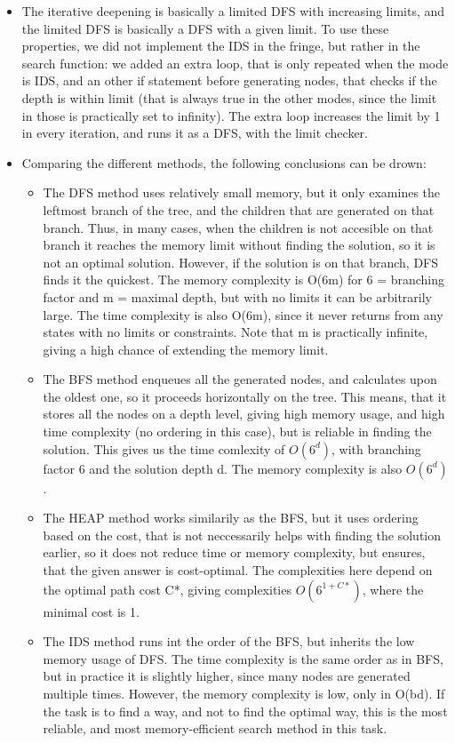 \documentclass{article}
\begin{document}
\begin{itemize}
	\item The iterative deepening is basically a limited DFS with increasing limits, and the limited DFS is basically a DFS with a given limit. To use these properties, we did not implement the IDS in the fringe, but rather in the search function: we added an extra loop, that is only repeated when the mode is IDS, and an other if statement before generating nodes, that checks if the depth is within limit (that is always true in the other modes, since the limit in those is practically set to infinity). The extra loop increases the limit by 1 in every iteration, and runs it as a DFS, with the limit checker.
	\item Comparing the different methods, the following conclusions can be drown:
	\begin{itemize}
		\item The DFS method uses relatively small memory, but it only examines the leftmost branch of the tree, and the children that are generated on that branch. Thus, in many cases, when the children is not accesible on that branch it reaches the memory limit without finding the solution, so it is not an optimal solution. However, if the solution is on that branch, DFS finds it the quickest. The memory complexity is O(6m) for 6 = branching factor and m = maximal depth, but with no limits it can be arbitrarily large. The time complexity is also O(6m), since it never returns from any states with no limits or constraints. Note that m is practically infinite, giving a high chance of extending the memory limit.
		\item The BFS method enqueues all the generated nodes, and calculates upon the oldest one, so it proceeds horizontally on the tree. This means, that it stores all the nodes on a depth level, giving high memory usage, and high time complexity (no ordering in this case), but is reliable in finding the solution. This gives us the time comlexity of $O(6^d)$, with branching factor 6 and the solution depth d. The memory complexity is also $O(6^d)$.
		\item The HEAP method works similarily as the BFS, but it uses ordering based on the cost, that is not neccessarily helps with finding the solution earlier, so it does not reduce time or memory complexity, but ensures, that the given answer is cost-optimal. The complexities here depend on the optimal path cost C*, giving complexities $O(6^{1 + C*})$, where the minimal cost is 1.
		\item The IDS method runs int the order of the BFS, but inherits the low memory usage of DFS. The time complexity is the same order as in BFS, but in practice it is slightly higher, since many nodes are generated multiple times. However, the memory complexity is low, only in O(bd). If the task is to find a way, and not to find the optimal way, this is the most reliable, and most memory-efficient search method in this task. 
	\end{itemize} 
\end{itemize}
\end{document}
